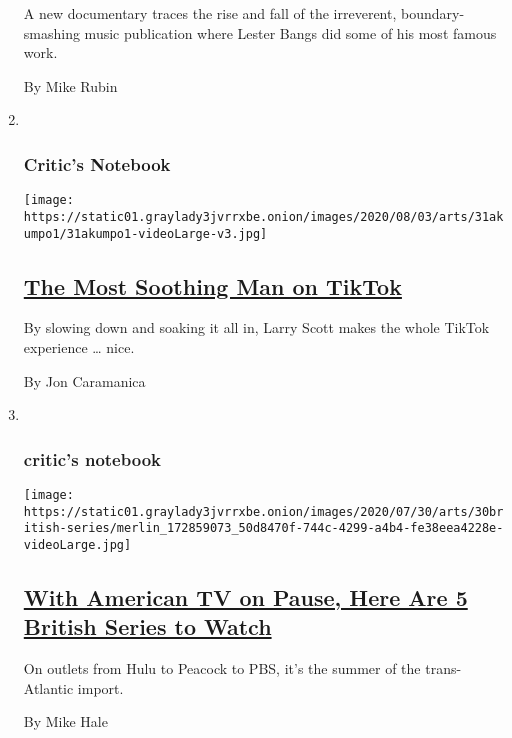\begin{enumerate}
  A new documentary traces the rise and fall of the irreverent,
  boundary-smashing music publication where Lester Bangs did some of his
  most famous work.

  By Mike Rubin
\item ~
  \hypertarget{critics-notebook-1}{%
  \subsubsection{Critic's Notebook}\label{critics-notebook-1}}

  \texttt{[image: https://static01.graylady3jvrrxbe.onion/images/2020/08/03/arts/31akumpo1/31akumpo1-videoLarge-v3.jpg]}

  \hypertarget{the-most-soothing-man-on-tiktok}{%
  \subsection{\texorpdfstring{\href{/2020/07/31/arts/larry-scott-tiktok-larryakumpo.html}{The
  Most Soothing Man on
  TikTok}}{The Most Soothing Man on TikTok}}\label{the-most-soothing-man-on-tiktok}}

  By slowing down and soaking it all in, Larry Scott makes the whole
  TikTok experience \ldots{} nice.

  By Jon Caramanica
\item ~
  \hypertarget{critics-notebook-2}{%
  \subsubsection{critic's notebook}\label{critics-notebook-2}}

  \texttt{[image: https://static01.graylady3jvrrxbe.onion/images/2020/07/30/arts/30british-series/merlin\_172859073\_50d8470f-744c-4299-a4b4-fe38eea4228e-videoLarge.jpg]}

  \hypertarget{with-american-tv-on-pause-here-are-5-british-series-to-watch}{%
  \subsection{\texorpdfstring{\href{/2020/07/30/arts/television/in-my-skin-hulu.html}{With
  American TV on Pause, Here Are 5 British Series to
  Watch}}{With American TV on Pause, Here Are 5 British Series to Watch}}\label{with-american-tv-on-pause-here-are-5-british-series-to-watch}}

  On outlets from Hulu to Peacock to PBS, it's the summer of the
  trans-Atlantic import.

  By Mike Hale
\end{enumerate}

